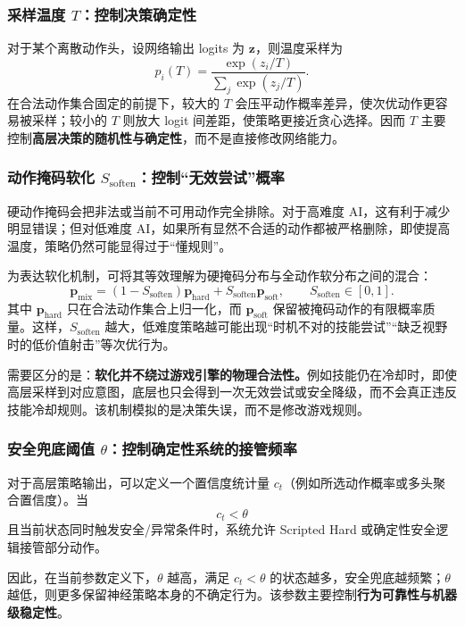 \documentclass[UTF8,a4paper,11pt]{ctexart}
\begin{document}
\subsubsection{采样温度 $T$：控制决策确定性}
对于某个离散动作头，设网络输出 logits 为 $\bm z$，则温度采样为
\begin{equation}
    p_i(T)
    =
    \frac{\exp(z_i/T)}
    {\sum_j\exp(z_j/T)}.
\end{equation}
在合法动作集合固定的前提下，较大的 $T$ 会压平动作概率差异，使次优动作更容易被采样；较小的 $T$ 则放大 logit 间差距，使策略更接近贪心选择。因而 $T$ 主要控制\textbf{高层决策的随机性与确定性}，而不是直接修改网络能力。

\subsubsection{动作掩码软化 $S_{\mathrm{soften}}$：控制“无效尝试”概率}
硬动作掩码会把非法或当前不可用动作完全排除。对于高难度 AI，这有利于减少明显错误；但对低难度 AI，如果所有显然不合适的动作都被严格删除，即使提高温度，策略仍然可能显得过于“懂规则”。

为表达软化机制，可将其等效理解为硬掩码分布与全动作软分布之间的混合：
\begin{equation}
    \bm p_{\mathrm{mix}}
    =
    (1-S_{\mathrm{soften}})\bm p_{\mathrm{hard}}
    +
    S_{\mathrm{soften}}\bm p_{\mathrm{soft}},
    \qquad
    S_{\mathrm{soften}}\in[0,1].
\end{equation}
其中 $\bm p_{\mathrm{hard}}$ 只在合法动作集合上归一化，而 $\bm p_{\mathrm{soft}}$ 保留被掩码动作的有限概率质量。这样，$S_{\mathrm{soften}}$ 越大，低难度策略越可能出现“时机不对的技能尝试”“缺乏视野时的低价值射击”等次优行为。

需要区分的是：\textbf{软化并不绕过游戏引擎的物理合法性。}例如技能仍在冷却时，即使高层采样到对应意图，底层也只会得到一次无效尝试或安全降级，而不会真正违反技能冷却规则。该机制模拟的是决策失误，而不是修改游戏规则。

\subsubsection{安全兜底阈值 $\theta$：控制确定性系统的接管频率}
对于高层策略输出，可以定义一个置信度统计量 $c_t$（例如所选动作概率或多头聚合置信度）。当
\begin{equation}
    c_t < \theta
\end{equation}
且当前状态同时触发安全/异常条件时，系统允许 Scripted Hard 或确定性安全逻辑接管部分动作。

因此，在当前参数定义下，$\theta$ 越高，满足 $c_t<\theta$ 的状态越多，安全兜底越频繁；$\theta$ 越低，则更多保留神经策略本身的不确定行为。该参数主要控制\textbf{行为可靠性与机器级稳定性}。
\end{document}
